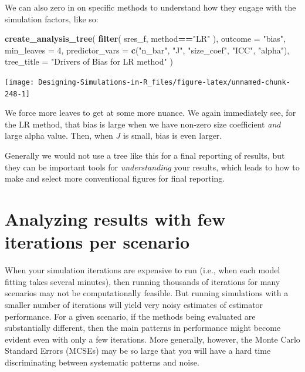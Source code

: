 \documentclass[
]{book}
\newenvironment{Shaded}{\begin{snugshade}}{\end{snugshade}}
\newcommand{\AttributeTok}[1]{\textcolor[rgb]{0.13,0.29,0.53}{#1}}
\newcommand{\DecValTok}[1]{\textcolor[rgb]{0.00,0.00,0.81}{#1}}
\newcommand{\FunctionTok}[1]{\textcolor[rgb]{0.13,0.29,0.53}{\textbf{#1}}}
\newcommand{\NormalTok}[1]{#1}
\newcommand{\SpecialCharTok}[1]{\textcolor[rgb]{0.81,0.36,0.00}{\textbf{#1}}}
\newcommand{\StringTok}[1]{\textcolor[rgb]{0.31,0.60,0.02}{#1}}
\begin{document}
We can also zero in on specific methods to understand how they engage with the simulation factors, like so:

\begin{Shaded}
\begin{Highlighting}[]
\FunctionTok{create\_analysis\_tree}\NormalTok{( }\FunctionTok{filter}\NormalTok{( sres\_f, method}\SpecialCharTok{==}\StringTok{"LR"}\NormalTok{ ),}
                      \AttributeTok{outcome =} \StringTok{"bias"}\NormalTok{,}
                      \AttributeTok{min\_leaves =} \DecValTok{4}\NormalTok{,}
                      \AttributeTok{predictor\_vars =} \FunctionTok{c}\NormalTok{(}\StringTok{"n\_bar"}\NormalTok{, }\StringTok{"J"}\NormalTok{,}
                                         \StringTok{"size\_coef"}\NormalTok{, }\StringTok{"ICC"}\NormalTok{, }\StringTok{"alpha"}\NormalTok{),}
                      \AttributeTok{tree\_title =} \StringTok{"Drivers of Bias for LR method"}\NormalTok{ )}
\end{Highlighting}
\end{Shaded}

\begin{center}\texttt{[image: Designing-Simulations-in-R\_files/figure-latex/unnamed-chunk-248-1]} \end{center}

We force more leaves to get at some more nuance.
We again immediately see, for the LR method, that bias is large when we have non-zero size coefficient \emph{and} large alpha value.
Then, when \(J\) is small, bias is even larger.

Generally we would not use a tree like this for a final reporting of results, but they can be important tools for \emph{understanding} your results, which leads to how to make and select more conventional figures for final reporting.

\section{Analyzing results with few iterations per scenario}\label{analyzing-results-with-few-iterations-per-scenario}

When your simulation iterations are expensive to run (i.e., when each model fitting takes several minutes), then running thousands of iterations for many scenarios may not be computationally feasible.
But running simulations with a smaller number of iterations will yield very noisy estimates of estimator performance.
For a given scenario, if the methods being evaluated are substantially different, then the main patterns in performance might become evident even with only a few iterations. More generally, however, the Monte Carlo Standard Errors (MCSEs) may be so large that you will have a hard time discriminating between systematic patterns and noise.
\end{document}
